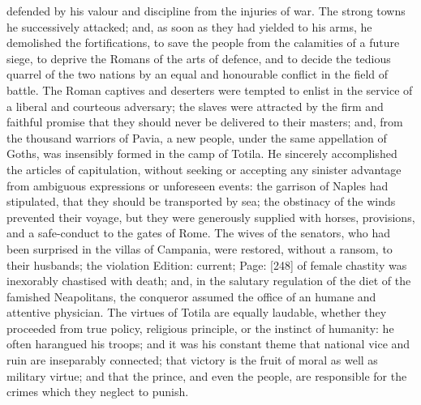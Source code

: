 defended by his valour and discipline from the injuries of war. The strong towns he successively attacked; and, as soon as they had yielded to his arms, he demolished the fortifications, to save the people from the calamities of a future siege, to deprive the Romans of the arts of defence, and to decide the tedious quarrel of the two nations by an equal and honourable conflict in the field of battle. The Roman captives and deserters were tempted to enlist in the service of a liberal and courteous adversary; the slaves were attracted by the firm and faithful promise that they should never be delivered to their masters; and, from the thousand warriors of Pavia, a new people, under the same appellation of Goths, was insensibly formed in the camp of Totila. He sincerely accomplished the articles of capitulation, without seeking or accepting any sinister advantage from ambiguous expressions or unforeseen events: the garrison of Naples had stipulated, that they should be transported by sea; the obstinacy of the winds prevented their voyage, but they were generously supplied with horses, provisions, and a safe-conduct to the gates of Rome. The wives of the senators, who had been surprised in the villas of Campania, were restored, without a ransom, to their husbands; the violation Edition: current; Page: [248] of female chastity was inexorably chastised with death; and, in the salutary regulation of the diet of the famished Neapolitans, the conqueror assumed the office of an humane and attentive physician. The virtues of Totila are equally laudable, whether they proceeded from true policy, religious principle, or the instinct of humanity: he often harangued his troops; and it was his constant theme that national vice and ruin are inseparably connected; that victory is the fruit of moral as well as military virtue; and that the prince, and even the people, are responsible for the crimes which they neglect to punish.

